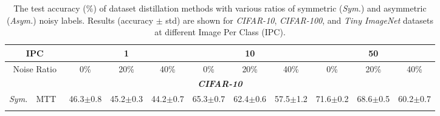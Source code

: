 \begin{table*}[ht!]
    \centering
    \renewcommand{\arraystretch}{.5}
    \setlength{\tabcolsep}{6pt}
    \caption{
    The test accuracy ($\%$) of dataset distillation methods with various ratios of symmetric (\textit{\textit{\textit{Sym.}}}) and asymmetric (\textit{Asym.}) noisy labels.
    Results (accuracy $\pm$ std) are shown for \textit{CIFAR-10}, \textit{CIFAR-100}, and \textit{Tiny ImageNet} datasets at different Image Per Class (IPC).
    }
    \tiny
\centering
\begin{tabular}{ccccccccccc}
\toprule
\multicolumn{2}{c|}{IPC}                                                           & \multicolumn{3}{c|}{1}                                                                                                     & \multicolumn{3}{c|}{10}                                                                                                    & \multicolumn{3}{c}{50}                                                                               \\ \midrule
\multicolumn{2}{c|}{Noise Ratio}                                                   & \multicolumn{1}{c|}{0\%}                           & \multicolumn{1}{c|}{20\%}         & \multicolumn{1}{c|}{40\%}         & \multicolumn{1}{c|}{0\%}                           & \multicolumn{1}{c|}{20\%}         & \multicolumn{1}{c}{40\%}         & \multicolumn{1}{c|}{0\%}                           & \multicolumn{1}{c|}{20\%}         & 40\%         \\ \midrule[.8pt] \midrule[.8pt]
\multicolumn{11}{c}{\textit{\textbf{CIFAR-10}}}                                                                                                                                                                                                                                                                                                                                                                                                     \\ \midrule[.8pt] \midrule[.8pt]
\multicolumn{1}{c|}{\multirow{20}{*}{\textit{Sym.}}}  & \multicolumn{1}{c|}{MTT~\cite{cazenavette2022distillation}}    & \multicolumn{1}{c|}{\multirow{3}{*}{46.3$\pm$0.8}} & \multicolumn{1}{c|}{45.2$\pm$0.3} & \multicolumn{1}{c|}{44.2$\pm$0.7} & \multicolumn{1}{c|}{\multirow{3}{*}{65.3$\pm$0.7}} & \multicolumn{1}{c|}{62.4$\pm$0.6} & \multicolumn{1}{c|}{57.5$\pm$1.2} & \multicolumn{1}{c|}{\multirow{3}{*}{71.6$\pm$0.2}} & \multicolumn{1}{c|}{68.6$\pm$0.5} & 60.2$\pm$0.7 \\ \cmidrule{2-2} \cmidrule{4-5} \cmidrule{7-8} \cmidrule{10-11}

\end{tabular}
\end{table*}
